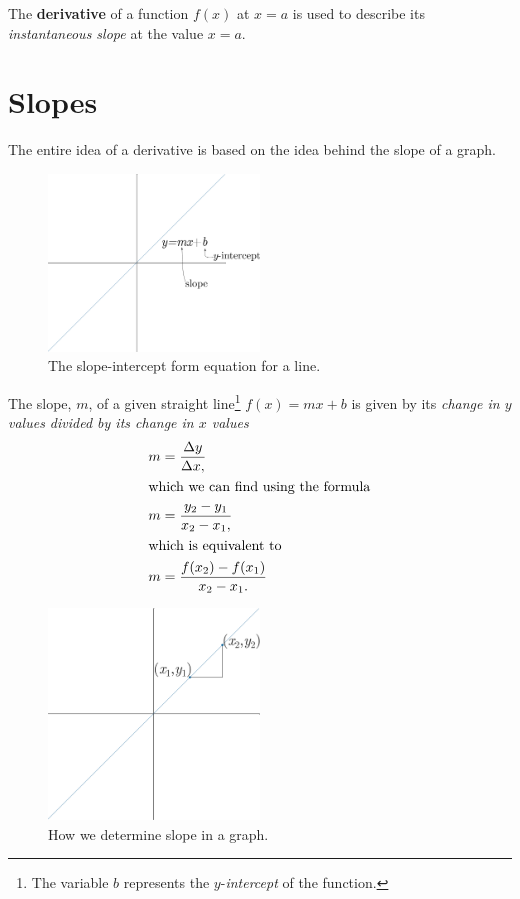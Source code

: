 The \textbf{derivative} of a function $f(x)$ at $x=a$ is used to describe its \emph{instantaneous slope} at the value $x=a$.

\section{Slopes}
The entire idea of a derivative is based on the idea behind the slope of a graph.
\begin{figure}[H]
  \begin{center}
    \includegraphics[width=0.5\textwidth]{continuous/derivatives/lineform.eps}
  \end{center}
  \caption{The slope-intercept form equation for a line.}
\end{figure}
The slope, $m$, of a given straight line\footnote{The variable $b$ represents the $y$-{\em intercept\/} of the function.}
$f(x)=mx+b$ is given by its \emph{change in $y$ values divided by its change in $x$ values}
\begin{align}
  \label{eq:slope}
  m&=\frac{\Delta y}{\Delta x,} \\
  \intertext{which we can find using the formula}
  m&=\frac{y_2-y_1}{x_2-x_1,} \\
  \intertext{which is equivalent to}
  m&=\frac{f(x_2)-f(x_1)}{x_2-x_1.}
\end{align}
\begin{figure}[H]
  \begin{center}
    \includegraphics[width=0.5\textwidth]{continuous/derivatives/lineform_slope.eps}
  \end{center}
  \caption{How we determine slope in a graph.}
\end{figure}

